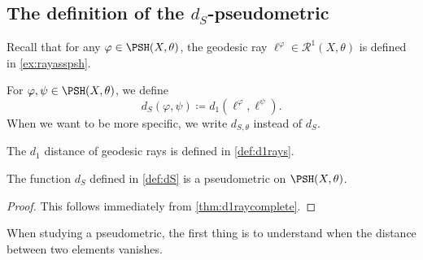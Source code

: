 \subsection{The definition of the \texorpdfstring{$d_S$}{dS}-pseudometric}
\label{subsec:dS_def}
Recall that for any $\varphi\in \PSH(X,\theta)$, the geodesic ray $\ell^{\varphi}\in \mathcal{R}^1(X,\theta)$ is defined in \cref{ex:rayasspsh}.
\begin{definition}\label{def:dS}
    For $\varphi,\psi\in \PSH(X,\theta)$, we define
    \[
        d_S(\varphi,\psi)\coloneqq d_1(\ell^{\varphi},\ell^{\psi}).
    \]
    When we want to be more specific, we write $d_{S,\theta}$ instead of $d_S$.
\end{definition}
The $d_1$ distance of geodesic rays is defined in \cref{def:d1rays}.

\begin{proposition}\label{prop:comp:L686}
    The function $d_S$ defined in \cref{def:dS} is a pseudometric on $\PSH(X,\theta)$.
\end{proposition}
\begin{proof}
    This follows immediately from \cref{thm:d1raycomplete}.
\end{proof}
When studying a pseudometric, the first thing is to understand when the distance between two elements vanishes.

